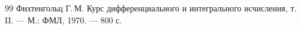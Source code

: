 \newpage
\renewcommand\refname{\centering СПИСОК ИСПОЛЬЗОВАННЫХ ИСТОЧНИКОВ}
\begin {thebibliography} {99}
Фихтенгольц Г.\,М. Курс дифференциального
и интегрального исчисления,
т. II. --- М.: ФМЛ, 1970. --- 800 с.
\end {thebibliography}



